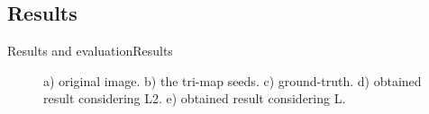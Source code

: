 \documentclass[10pt]{beamer}
\begin{document}
\subsection{Results}
\begin{frame}{Results and evaluation}{Results}

\begin{figure}[H]
  \centering
  \quad
  \quad
  \end{figure}
  \vspace{-0.5cm}
  \begin{figure}[H]
  \centering
  \quad
  \caption{a) original image. b) the tri-map seeds. c) ground-truth. d) obtained result considering L2. e) obtained result considering L.}
  \end{figure}

\end{frame}
\end{document}
